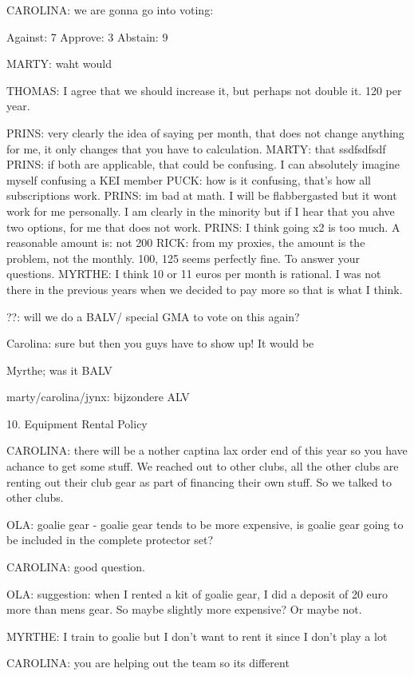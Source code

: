 \documentclass[12pt, a4paper]{article}
\begin{document}
CAROLINA: we are gonna go into voting:

Against: 7
Approve: 3 
Abstain: 9

MARTY: waht would

THOMAS: I agree that we should increase it, but perhaps not double it. 120 per year.

PRINS: very clearly the idea of saying per month, that does not change anything for me, it only changes that you have to calculation.
MARTY: that ssdfsdfsdf
PRINS: if both are applicable, that could be confusing. I can absolutely imagine myself confusing a KEI member
PUCK: how is it confusing, that's how all subscriptions work.
PRINS: im bad at math. I will be flabbergasted but it wont work for me personally. I am clearly in the minority but if I hear that you ahve two options, for me that does not work.
PRINS: I think going x2 is too much. A reasonable amount is: not 200%
RICK: from my proxies, the amount is the problem, not the monthly. 100, 125 seems perfectly fine. To answer your questions.
MYRTHE: I think 10 or 11 euros per month is rational. I was not  there in the previous years when we decided to pay more so that is what I think.

??: will we do a BALV/ special GMA to vote on this again? 

Carolina: sure but then you guys have to show up! It would be 

Myrthe; was it BALV

marty/carolina/jynx: bijzondere ALV

10. Equipment Rental Policy

CAROLINA: there will be a nother captina lax order end of this year so you have achance to get some stuff. We reached out to other clubs, all the other clubs are renting out their club gear as part of financing their own stuff. So we talked to other clubs. 

OLA: goalie gear - goalie gear tends to be more expensive, is goalie gear going to be included in the complete protector set?

CAROLINA: good question.

OLA: suggestion: when I rented a kit of goalie gear, I did a deposit of 20 euro more than mens gear. So maybe slightly more expensive? Or maybe not.

MYRTHE: I train to goalie but I don't want to rent it since I don't play a lot

CAROLINA: you are helping out the team so  its different
\end{document}
